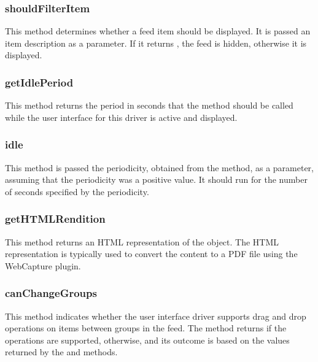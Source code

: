 \documentclass[letterpaper,12pt,english,openany,oneside]{sphinxmanual}
\begin{document}
\subsubsection{shouldFilterItem}
\label{\detokenize{Tracker_InboxAPI:shouldfilteritem}}
This method determines whether a feed item should be displayed. It is passed an item description as a parameter. If it returns , the feed is hidden, otherwise it is displayed.




\subsubsection{getIdlePeriod}
\label{\detokenize{Tracker_InboxAPI:getidleperiod}}
This method returns the period in seconds that the  method should be called while the user interface for this driver is active and displayed.




\subsubsection{idle}
\label{\detokenize{Tracker_InboxAPI:idle}}
This method is passed the periodicity, obtained from the  method, as a parameter, assuming that the periodicity was a positive value. It should run for the number of seconds specified by the periodicity.




\subsubsection{getHTMLRendition}
\label{\detokenize{Tracker_InboxAPI:gethtmlrendition}}
This method returns an HTML representation of the  object. The HTML representation is typically used to convert the content to a PDF file using the WebCapture plug\sphinxhyphen{}in.




\subsubsection{canChangeGroups}
\label{\detokenize{Tracker_InboxAPI:canchangegroups}}
This method indicates whether the user interface driver supports drag and drop operations on items between groups in the feed. The method returns  if the operations are supported,  otherwise, and its outcome is based on the values returned by the  and  methods.
\end{document}
